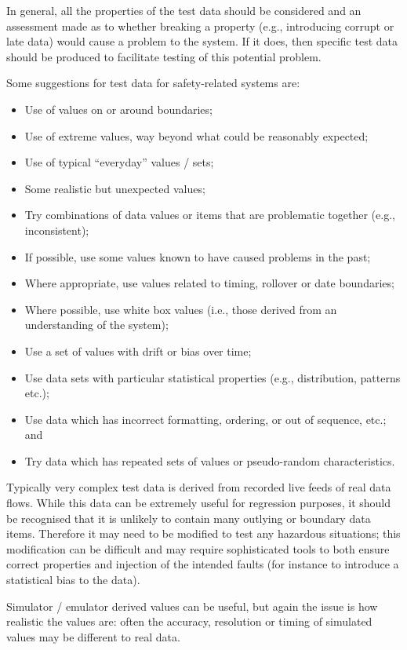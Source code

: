 In general, all the properties of the test data should be considered and an assessment made as to whether breaking a property (e.g., introducing corrupt or late data) would cause a problem to the system. If it does, then specific test data should be produced to facilitate testing of this potential problem.

Some suggestions for test data for safety-related systems are:
\begin{itemize}
  \item Use of values on or around boundaries;
  \item Use of extreme values, way beyond what could be reasonably expected;
  \item Use of typical ``everyday'' values / sets;
  \item Some realistic but unexpected values;
  \item Try combinations of data values or items that are problematic together (e.g., inconsistent);
  \item If possible, use some values known to have caused problems in the past;
  \item Where appropriate, use values related to timing, rollover or date boundaries;
  \item Where possible, use white box values (i.e., those derived from an understanding of the system);
  \item Use a set of values with drift or bias over time;
  \item Use data sets with particular statistical properties (e.g., distribution, patterns etc.);
  \item Use data which has incorrect formatting, ordering, or out of sequence, etc.; and
  \item Try data which has repeated sets of values or pseudo-random characteristics.
\end{itemize}
Typically very complex test data is derived from recorded live feeds of real data flows. While this data can be extremely useful for regression purposes, it should be recognised that it is unlikely to contain many outlying or boundary data items. Therefore it may need to be modified to test any hazardous situations; this modification can be difficult and may require sophisticated tools to both ensure correct properties and injection of the intended faults (for instance to introduce a statistical bias to the data).

Simulator / emulator derived values can be useful, but again the issue is how realistic the values are: often the \gls{accuracy}, resolution or timing of simulated values may be different to real data.

